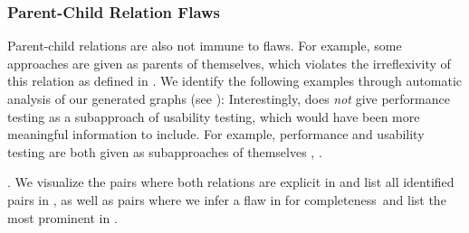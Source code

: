 \subsubsection{Parent-Child Relation Flaws}\label{pars}
\label{selfPars}
Parent-child relations are also not immune to flaws. For example, some
approaches are given as parents of themselves, which violates the
irreflexivity of this relation as defined in .
\ifnotpaper We identify
    the following \selfParCount{} examples through automatic analysis of our
    generated graphs (see ):
     Interestingly, \citet{Gerrard2000a,Gerrard2000b}
    does \emph{not} give performance testing as a subapproach of usability
    testing, which would have been more meaningful information to include.
\else For example, performance and usability testing are both
    given as subapproaches of themselves \cite[Tab.~2]{Gerrard2000a},
    \cite[Tab.~1]{Gerrard2000b}.\fi

\label{parSyns}\parSynIntro{}\ifnotpaper. We visualize the
pairs where both relations are explicit in  and list
all identified pairs in , as well as pairs where we infer a
flaw in  for completeness\else\ and list the most
prominent in \fi.

